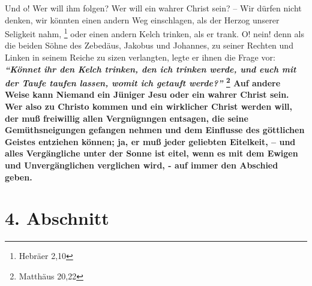 Und o! Wer will ihm folgen? Wer will ein wahrer Christ sein? -- Wir dürfen nicht
denken, wir könnten einen andern Weg einschlagen, als der Herzog unserer
Seligkeit nahm,
\footnote{Hebräer 2,10}
oder einen andern Kelch trinken, als er
trank. O! nein! denn als die beiden Söhne des Zebedäus, Jakobus und Johannes, zu
seiner Rechten und Linken in seinem Reiche zu sizen verlangten, legte er ihnen
die Frage vor:
\textbf{\textit{"`Könnet ihr den Kelch trinken, den ich trinken werde, und euch
mit der Taufe taufen lassen, womit ich getauft werde?"'} 
\footnote{Matthäus 20,22}
Auf andere Weise kann Niemand ein Jüniger Jesu oder ein wahrer Christ sein. Wer
also zu Christo kommen und ein wirklicher Christ werden will, der muß freiwillig
allen Vergnügnngen entsagen, die seine Gemüthsneigungen gefangen nehmen und dem
Einflusse des göttlichen Geistes entziehen können; ja, er muß jeder geliebten
Eitelkeit, -- und alles Vergängliche unter der Sonne ist eitel, wenn es mit dem
Ewigen und Unvergänglichen verglichen wird, - auf immer den Abschied geben.}

\section{4. Abschnitt} \label{kap16_ab4}

